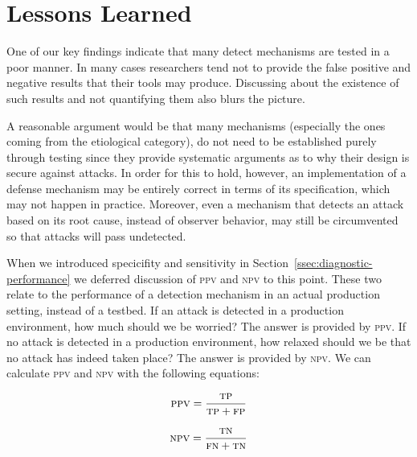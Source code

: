 \documentclass[conference]{IEEEtran}
\begin{document}
\section{Lessons Learned}
\label{sec:lessons-learned}


One of our key findings indicate that many detect mechanisms are
tested in a poor manner. In many cases researchers tend not to provide
the false positive and negative results that their tools may produce.
Discussing about the existence of such results and not quantifying
them also blurs the picture.

A reasonable argument would be that many mechanisms (especially the
ones coming from the etiological category), do not need to be
established purely through testing since they provide systematic
arguments as to why their design is secure against attacks. In order
for this to hold, however, an implementation of a defense mechanism
may be entirely correct in terms of its specification, which may not
happen in practice. Moreover, even a mechanism that detects an attack
based on its root cause, instead of observer behavior, may still be
circumvented so that attacks will pass undetected.

When we introduced specicifity and sensitivity in
Section~\ref{ssec:diagnostic-performance} we deferred discussion of
\textsc{ppv} and \textsc{npv} to this point. These two relate to the
performance of a detection mechanism in an actual production setting,
instead of a testbed. If an attack is detected in a production
environment, how much should we be worried? The answer is provided by
\textsc{ppv}. If no attack is detected in a production environment,
how relaxed should we be that no attack has indeed taken place? The
answer is provided by \textsc{npv}. We can calculate \textsc{ppv} and
\textsc{npv} with the following equations:

\begin{equation}
\textsc{ppv} = \frac{\textsc{tp}}{\textsc{tp} + \textsc{fp}}
\end{equation}

\begin{equation}
\textsc{npv} = \frac{\textsc{tn}}{\textsc{fn} + \textsc{tn}}
\end{equation}
\end{document}
